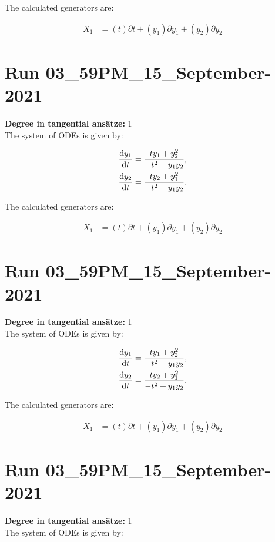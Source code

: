 \noindent The calculated generators are:

\begin{align*}
X_{1}&=\left( t \right)\partial t+\left( y_{1} \right)\partial y_{1}+\left( y_{2} \right)\partial y_{2}\end{align*}
\section*{Run 03\_59PM\_15\_September-2021}
\textbf{Degree in tangential ansätze:}	1\\
The system of ODEs is given by:

\begin{align*}
\dv{y_{1}}{t}&=\frac{t y_{1} + y_{2}^{2}}{- t^{2} + y_{1} y_{2}},\\
\dv{y_{2}}{t}&=\frac{t y_{2} + y_{1}^{2}}{- t^{2} + y_{1} y_{2}}.\\
\end{align*}

\noindent The calculated generators are:

\begin{align*}
X_{1}&=\left( t \right)\partial t+\left( y_{1} \right)\partial y_{1}+\left( y_{2} \right)\partial y_{2}\end{align*}
\section*{Run 03\_59PM\_15\_September-2021}
\textbf{Degree in tangential ansätze:}	1\\
The system of ODEs is given by:

\begin{align*}
\dv{y_{1}}{t}&=\frac{t y_{1} + y_{2}^{2}}{- t^{2} + y_{1} y_{2}},\\
\dv{y_{2}}{t}&=\frac{t y_{2} + y_{1}^{2}}{- t^{2} + y_{1} y_{2}}.\\
\end{align*}

\noindent The calculated generators are:

\begin{align*}
X_{1}&=\left( t \right)\partial t+\left( y_{1} \right)\partial y_{1}+\left( y_{2} \right)\partial y_{2}\end{align*}
\section*{Run 03\_59PM\_15\_September-2021}
\textbf{Degree in tangential ansätze:}	1\\
The system of ODEs is given by:

